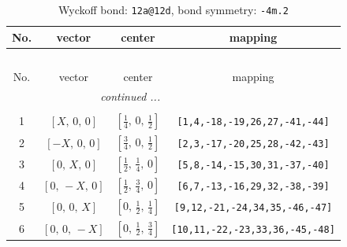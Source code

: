 \documentclass[fleqn,8pt]{jsarticle}
\begin{document}
\begin{longtable}{cccc}
\caption{Wyckoff bond: {\tt 12a@12d}, bond symmetry: {\tt -4m.2}}
 \\
 \hline \hline
No. & vector & center & mapping \\ \hline \endfirsthead

\multicolumn{3}{l}{\tablename\ \thetable{}} \\
 \hline \hline
No. & vector & center & mapping \\ \hline \endhead

 \hline \hline
\multicolumn{3}{r}{\footnotesize\it continued ...} \\ \endfoot

 \hline \hline
\multicolumn{3}{r}{} \\ \endlastfoot

1 & $\left[ X,\, 0,\, 0 \right]$ & $\left[ \frac{1}{4},\, 0,\, \frac{1}{2} \right]$ & {\tt [1,4,-18,-19,26,27,-41,-44]} \\ \hline
2 & $\left[ - X,\, 0,\, 0 \right]$ & $\left[ \frac{3}{4},\, 0,\, \frac{1}{2} \right]$ & {\tt [2,3,-17,-20,25,28,-42,-43]} \\ \hline
3 & $\left[ 0,\, X,\, 0 \right]$ & $\left[ \frac{1}{2},\, \frac{1}{4},\, 0 \right]$ & {\tt [5,8,-14,-15,30,31,-37,-40]} \\ \hline
4 & $\left[ 0,\, - X,\, 0 \right]$ & $\left[ \frac{1}{2},\, \frac{3}{4},\, 0 \right]$ & {\tt [6,7,-13,-16,29,32,-38,-39]} \\ \hline
5 & $\left[ 0,\, 0,\, X \right]$ & $\left[ 0,\, \frac{1}{2},\, \frac{1}{4} \right]$ & {\tt [9,12,-21,-24,34,35,-46,-47]} \\ \hline
6 & $\left[ 0,\, 0,\, - X \right]$ & $\left[ 0,\, \frac{1}{2},\, \frac{3}{4} \right]$ & {\tt [10,11,-22,-23,33,36,-45,-48]} \\
\end{longtable}
\renewcommand{\arraystretch}{1.2}
\end{document}
